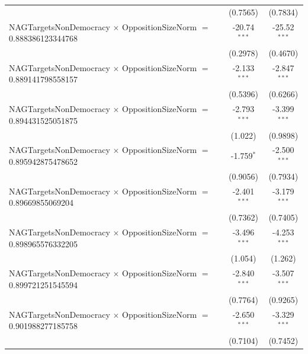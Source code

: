 \begin{tabular}{lcc}
                                                                                & (0.7565)             & (0.7834)\\   
   NAGTargetsNonDemocracy $\times$ OppositionSizeNorm $=$ 0.888386123344768     & -20.74$^{***}$       & -25.52$^{***}$\\   
                                                                                & (0.2978)             & (0.4670)\\   
   NAGTargetsNonDemocracy $\times$ OppositionSizeNorm $=$ 0.889141798558157     & -2.133$^{***}$       & -2.847$^{***}$\\   
                                                                                & (0.5396)             & (0.6266)\\   
   NAGTargetsNonDemocracy $\times$ OppositionSizeNorm $=$ 0.894431525051875     & -2.793$^{***}$       & -3.399$^{***}$\\   
                                                                                & (1.022)              & (0.9898)\\   
   NAGTargetsNonDemocracy $\times$ OppositionSizeNorm $=$ 0.895942875478652     & -1.759$^{*}$         & -2.500$^{***}$\\   
                                                                                & (0.9056)             & (0.7934)\\   
   NAGTargetsNonDemocracy $\times$ OppositionSizeNorm $=$ 0.89669855069204      & -2.401$^{***}$       & -3.179$^{***}$\\   
                                                                                & (0.7362)             & (0.7405)\\   
   NAGTargetsNonDemocracy $\times$ OppositionSizeNorm $=$ 0.898965576332205     & -3.496$^{***}$       & -4.253$^{***}$\\   
                                                                                & (1.054)              & (1.262)\\   
   NAGTargetsNonDemocracy $\times$ OppositionSizeNorm $=$ 0.899721251545594     & -2.840$^{***}$       & -3.507$^{***}$\\   
                                                                                & (0.7764)             & (0.9265)\\   
   NAGTargetsNonDemocracy $\times$ OppositionSizeNorm $=$ 0.901988277185758     & -2.650$^{***}$       & -3.329$^{***}$\\   
                                                                                & (0.7104)             & (0.7452)\\   

\end{tabular}
